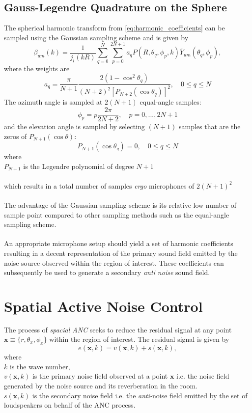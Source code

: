 \subsection{Gauss-Legendre Quadrature on the Sphere}
The spherical harmonic transform from \ref{eq:harmonic_coefficients} can be sampled using the Gaussian sampling scheme and is given by
\begin{equation}
    \beta_{um}(k) = \frac{1}{j_l(kR)} \sum_{q=0}^N\sum_{p=0}^{2N+1}a_qP(R,\theta_q,\phi_p,k)\overline Y_{um}(\theta_q,\phi_p),
\end{equation}
where the weights are
\begin{equation}
    a_q = \frac{\pi}{N+1}\frac{2(1-\cos^2\theta_q)}{(N+2)^2[P_{N+2}(\cos \theta_q)]^2}, \quad 0 \leq q\leq N
\end{equation}
The azimuth angle is sampled at $2(N+1)$ equal-angle samples:
\begin{equation}
    \phi_p = p\frac{2\pi}{2N+2},\quad p=0,...,2N+1
\end{equation}
and the elevation angle is sampled by selecting $(N+1)$ samples that are the zeros of $P_{N+1}(\cos\theta)$:
\begin{equation}
    P_{N+1}(\cos\theta_q)=0, \quad 0 \leq q \leq N
\end{equation}
where\\
$P_{N+1}$ is the Legendre polynomial of degree $N+1$\\\\
which results in a total number of samples \textit{ergo} microphones of $2(N+1)^2$\\\\
The advantage of the Gaussian sampling scheme is its relative low number of sample point compared to other sampling methods such as the equal-angle sampling scheme\cite{Rafaely2015}.\\\\
An appropriate microphone setup should yield a set of harmonic coefficients resulting in a decent representation of the primary sound field emitted by the noise source observed within the region of interest. These coefficients can subsequently be used to generate a secondary \textit{anti noise} sound field.

\section{Spatial Active Noise Control}
The process of \textit{spacial ANC} seeks to reduce the residual signal at any point $\mathbf{x} \equiv \{r,\theta_x, \phi_x\}$ within the region of interest. The residual signal is given by
\begin{equation}
    e(\mathbf{x},k) = v(\mathbf{x},k) + s(\mathbf{x},k),
\end{equation}
where\\
$k$ is the wave number,\\
$v(\mathbf{x},k)$ is the primary noise field observed at a point $\mathbf{x}$ i.e. the noise field generated by the noise source and its reverberation in the room.\\
$s(\mathbf{x},k)$ is the secondary noise field i.e. the \textit{anti-}noise field emitted by the set of loudspeakers on behalf of the ANC process.
